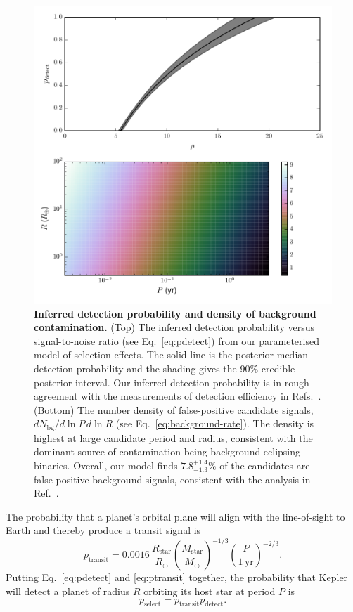 \documentclass[12pt]{article}
\newcommand{\RSun}{R_\odot}
\newcommand{\RStar}{R_\mathrm{star}}
\newcommand{\MStar}{M_\mathrm{star}}
\newcommand{\MSun}{M_\odot}
\newcommand{\Nbg}{N_\mathrm{bg}}
\newcommand{\fposrange}{7.8_{-1.3}^{+1.4}\%}
\begin{document}
\begin{figure}
  \includegraphics[width=\columnwidth]{bg}
  \caption{\label{fig:det-bg} \textbf{Inferred detection probability
      and density of background contamination.} (Top) The inferred
    detection probability versus signal-to-noise ratio (see
    Eq.\ \eqref{eq:pdetect}) from our parameterised model of selection
    effects.  The solid line is the posterior median detection
    probability and the shading gives the 90\% credible posterior
    interval.  Our inferred detection probability is in rough
    agreement with the measurements of detection efficiency in
    Refs.\ \cite{Borucki2011,Batalha2013}.  (Bottom) The number
    density of false-positive candidate signals, $d\Nbg/d\ln P \, d\ln
    R$ (see Eq.\ \eqref{eq:background-rate}).  The density is highest
    at large candidate period and radius, consistent with the dominant
    source of contamination being background eclipsing
    binaries\cite{Fressin2013}.  Overall, our model finds $\fposrange$
    of the candidates are false-positive background signals,
    consistent with the analysis in Ref.\ \cite{Fressin2013}.}
\end{figure}

The probability that a planet's orbital plane will align with the line-of-sight to
Earth and thereby produce a transit signal is
\begin{equation}
  \label{eq:ptransit}
  p_\mathrm{transit} = 0.0016\, \frac{\RStar}{\RSun}
  \left(\frac{\MStar}{\MSun}\right)^{-1/3} \left(\frac{P}{1\,\mathrm{yr}}\right)^{-2/3}.
\end{equation}
Putting Eq.\ \ref{eq:pdetect} and \ref{eq:ptransit} together, the
probability that Kepler will detect a planet of radius $R$ orbiting
its host star at period $P$ is 
\begin{equation}
  \label{eq:pselect}
  p_\mathrm{select} = p_\mathrm{transit} p_\mathrm{detect}.
\end{equation}
\end{document}

